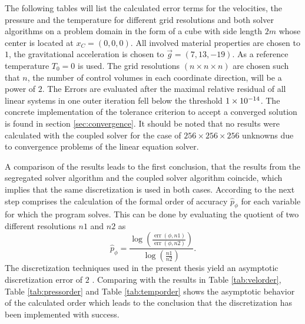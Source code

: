 The following tables will list the calculated error terms for the velocities, the pressure and the temperature for different grid resolutions and both solver algorithms on a problem domain in the form of a cube with side length \(2m\) whose center is located at \(x_C = \left(0,0,0\right) \). All involved material properties are chosen to \(1\), the gravitational acceleration is chosen to \(\vec{g} = \left(7,13,-19\right)\). As a reference temperature \(T_0 = 0\) is used. The grid resolutions \((n \times n \times n)\) are chosen such that \(n\), the number of control volumes in each coordinate direction, will be a power of \(2\). The Errors are evaluated after the maximal relative residual of all linear systems in one outer iteration fell below the threshold \(1\times 10^{-14}\). The concrete implementation of the tolerance criterion to accept a converged solution is found in section \ref{sec:convergence}. It should be noted that no results were calculated with the coupled solver for the case of \(256 \times 256 \times 256 \) unknowns due to convergence problems of the linear equation solver.

A comparison of the results leads to the first conclusion, that the results from the segregated solver algorithm and the coupled solver algorithm coincide, which implies that the same discretization is used in both cases. According to \cite{salari00} the next step comprises the calculation of the formal order of accuracy \(\hat{p}_\phi\) for each variable for which the program solves. This can be done by evaluating the quotient of two different resolutions \(n1\) and \(n2\) as 
\begin{displaymath}
  \hat{p}_{\phi} = \frac{\log\left(\frac{\operatorname{err}(\phi,{n1})}{\operatorname{err}(\phi,{n2})}\right)}{\log\left(\frac{n1}{n2}\right)}.
\end{displaymath}
The discretization techniques used in the present thesis yield an asymptotic discretization error of \(2\) \cite{schaefer99}. Comparing with the results in Table \ref{tab:velorder}, Table \ref{tab:pressorder} and Table \ref{tab:temporder} shows the asymptotic behavior of the calculated order which leads to the conclusion that the discretization has been implemented with success.

